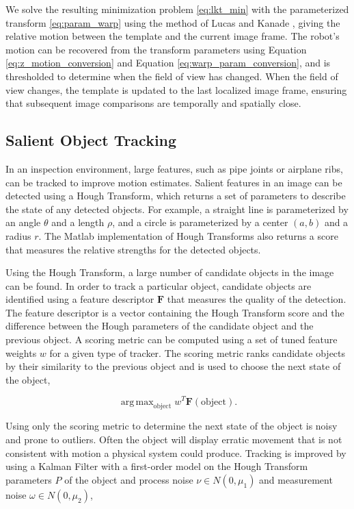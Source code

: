 \documentclass[letterpaper, 10 pt, conference]{ieeeconf}
\DeclareMathOperator*{\argmax}{arg\,max}
\begin{document}
We solve the resulting minimization problem \eqref{eq:lkt_min} with the parameterized transform \eqref{eq:param_warp} using the method of Lucas and Kanade \cite{Lucas81, lucaskanade}, giving the relative motion between the template and the current image frame. The robot's motion can be recovered from the transform parameters using Equation \eqref{eq:z_motion_conversion} and Equation \eqref{eq:warp_param_conversion}, and is thresholded to determine when the field of view has changed. When the field of view changes, the template is updated to the last localized image frame, ensuring that subsequent image comparisons are temporally and spatially close.


\subsection{Salient Object Tracking}

In an inspection environment, large features, such as pipe joints or airplane ribs, can be tracked to improve motion estimates. Salient features in an image can be detected using a Hough Transform, which returns a set of parameters to describe the state of any detected objects. For example, a straight line is parameterized by an angle $\theta$ and a length $\rho$, and a circle is parameterized by a center $(a, b)$ and a radius $r$. The Matlab implementation of Hough Transforms also returns a score that measures the relative strengths for the detected objects.

Using the Hough Transform, a large number of candidate objects in the image can be found. In order to track a particular object, candidate objects are identified using a feature descriptor $\textbf{F}$ that measures the quality of the detection. The feature descriptor is a vector containing the Hough Transform score and the difference between the Hough parameters of the candidate object and the previous object. A scoring metric can be computed using a set of tuned feature weights $w$ for a given type of tracker. The scoring metric ranks candidate objects by their similarity to the previous object and is used to choose the next state of the object,

\begin{equation}
	\argmax_{\textrm{object}} w^T \textbf{F}(\textrm{object}).
\end{equation}


Using only the scoring metric to determine the next state of the object is noisy and prone to outliers. Often the object will display erratic movement that is not consistent with motion a physical system could produce. Tracking is improved by using a Kalman Filter with a first-order model on the Hough Transform parameters $P$ of the object and process noise $\nu \in N(0, \mu_1)$ and measurement noise $\omega \in N(0, \mu_2)$,
\end{document}

